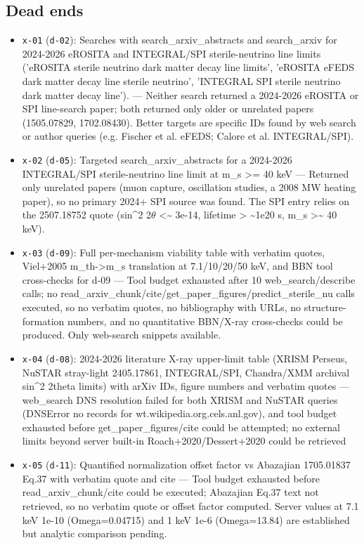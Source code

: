 \documentclass[11pt,a4paper]{article}
\begin{document}
\subsection{Dead ends}
\begin{itemize}
  \item \texttt{x-01} (\texttt{d-02}): Searches with search\_arxiv\_abstracts and search\_arxiv for 2024-2026 eROSITA and INTEGRAL/SPI sterile-neutrino line limits ('eROSITA sterile neutrino dark matter decay line limits', 'eROSITA eFEDS dark matter decay line sterile neutrino', 'INTEGRAL SPI sterile neutrino dark matter decay line'). --- Neither search returned a 2024-2026 eROSITA or SPI line-search paper; both returned only older or unrelated papers (1505.07829, 1702.08430). Better targets are specific IDs found by web search or author queries (e.g. Fischer et al. eFEDS; Calore et al. INTEGRAL/SPI).
  \item \texttt{x-02} (\texttt{d-05}): Targeted search\_arxiv\_abstracts for a 2024-2026 INTEGRAL/SPI sterile-neutrino line limit at m\_s \textgreater{}= 40 keV --- Returned only unrelated papers (muon capture, oscillation studies, a 2008 MW heating paper), so no primary 2024+ SPI source was found. The SPI entry relies on the 2507.18752 quote (sin\textasciicircum{}2 2$\theta$ \textless{}\textasciitilde{} 3e-14, lifetime \textgreater{} \textasciitilde{}1e20 s, m\_s \textgreater{}\textasciitilde{} 40 keV).
  \item \texttt{x-03} (\texttt{d-09}): Full per-mechanism viability table with verbatim quotes, Viel+2005 m\_th-\textgreater{}m\_s translation at 7.1/10/20/50 keV, and BBN tool cross-checks for d-09 --- Tool budget exhausted after 10 web\_search/describe calls; no read\_arxiv\_chunk/cite/get\_paper\_figures/predict\_sterile\_nu calls executed, so no verbatim quotes, no bibliography with URLs, no structure-formation numbers, and no quantitative BBN/X-ray cross-checks could be produced. Only web-search snippets available.
  \item \texttt{x-04} (\texttt{d-08}): 2024-2026 literature X-ray upper-limit table (XRISM Perseus, NuSTAR stray-light 2405.17861, INTEGRAL/SPI, Chandra/XMM archival sin\textasciicircum{}2 2theta limits) with arXiv IDs, figure numbers and verbatim quotes --- web\_search DNS resolution failed for both XRISM and NuSTAR queries (DNSError no records for wt.wikipedia.org.cels.anl.gov), and tool budget exhausted before get\_paper\_figures/cite could be attempted; no external limits beyond server built-in Roach+2020/Dessert+2020 could be retrieved
  \item \texttt{x-05} (\texttt{d-11}): Quantified normalization offset factor vs Abazajian 1705.01837 Eq.37 with verbatim quote and cite --- Tool budget exhausted before read\_arxiv\_chunk/cite could be executed; Abazajian Eq.37 text not retrieved, so no verbatim quote or offset factor computed. Server values at 7.1 keV 1e-10 (Omega=0.04715) and 1 keV 1e-6 (Omega=13.84) are established but analytic comparison pending.

\end{itemize}
\end{document}
